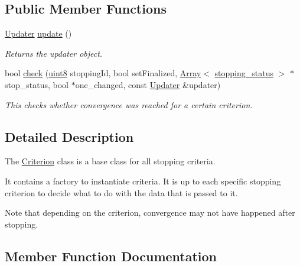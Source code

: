 \subsection*{Public Member Functions}
\begin{DoxyCompactItemize}
\item 
\hyperlink{classgko_1_1stop_1_1Criterion_1_1Updater}{Updater} \hyperlink{classgko_1_1stop_1_1Criterion_a47e22c46eaa742d709dcbf0d26d93e6c}{update} ()
\begin{DoxyCompactList}\small\item\em Returns the updater object. \end{DoxyCompactList}\item 
bool \hyperlink{classgko_1_1stop_1_1Criterion_a64634d8f02b439e5d8e6125fb996600d}{check} (\hyperlink{namespacegko_a3950fc3732811a8563484e5098c31531}{uint8} stopping\+Id, bool set\+Finalized, \hyperlink{classgko_1_1Array}{Array}$<$ \hyperlink{classgko_1_1stopping__status}{stopping\+\_\+status} $>$ $\ast$stop\+\_\+status, bool $\ast$one\+\_\+changed, const \hyperlink{classgko_1_1stop_1_1Criterion_1_1Updater}{Updater} \&updater)
\begin{DoxyCompactList}\small\item\em This checks whether convergence was reached for a certain criterion. \end{DoxyCompactList}\end{DoxyCompactItemize}


\subsection{Detailed Description}
The \hyperlink{classgko_1_1stop_1_1Criterion}{Criterion} class is a base class for all stopping criteria. 

It contains a factory to instantiate criteria. It is up to each specific stopping criterion to decide what to do with the data that is passed to it.

Note that depending on the criterion, convergence may not have happened after stopping. 

\subsection{Member Function Documentation}
\mbox{\label{classgko_1_1stop_1_1Criterion_a64634d8f02b439e5d8e6125fb996600d}} 
